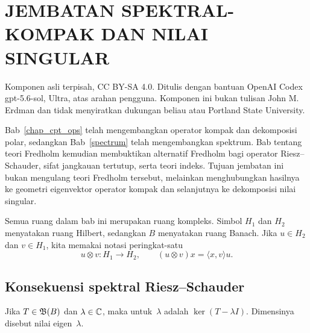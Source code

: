 
\chapter{JEMBATAN SPEKTRAL-KOMPAK DAN NILAI SINGULAR}
\label{o008bridge:compact-spectral-svd}

\begin{center}
\small
Komponen asli terpisah, CC BY-SA 4.0. Ditulis dengan bantuan OpenAI Codex
gpt-5.6-sol, Ultra, atas arahan pengguna. Komponen ini bukan tulisan John M.
Erdman dan tidak menyiratkan dukungan beliau atau Portland State University.
\end{center}

Bab~\ref{chap_cpt_ops} telah mengembangkan operator kompak dan dekomposisi
polar, sedangkan Bab~\ref{spectrum} telah mengembangkan spektrum. Bab tentang
teori Fredholm kemudian membuktikan alternatif Fredholm bagi operator
Riesz--Schauder, sifat jangkauan tertutup, serta teori indeks. Tujuan jembatan
ini bukan mengulang teori Fredholm tersebut, melainkan menghubungkan hasilnya
ke geometri eigenvektor operator kompak dan selanjutnya ke dekomposisi nilai
singular.

Semua ruang dalam bab ini merupakan ruang kompleks. Simbol $H_1$ dan $H_2$
menyatakan ruang Hilbert, sedangkan $B$ menyatakan ruang Banach. Jika
$u\in H_2$ dan $v\in H_1$, kita memakai notasi peringkat-satu
\[
  u\otimes v\colon H_1\longrightarrow H_2,
  \qquad
  (u\otimes v)x=\langle x,v\rangle u.
\]

\section{Konsekuensi spektral Riesz--Schauder}

\begin{defn}\label{o008bridge:spectral-multiplicity}
Jika $T\in\mathfrak{B}(B)$ dan $\lambda\in\mathbb{C}$, maka
 untuk~$\lambda$ adalah $\ker(T-\lambda I)$. Dimensinya
disebut  nilai eigen~$\lambda$.
\end{defn}

